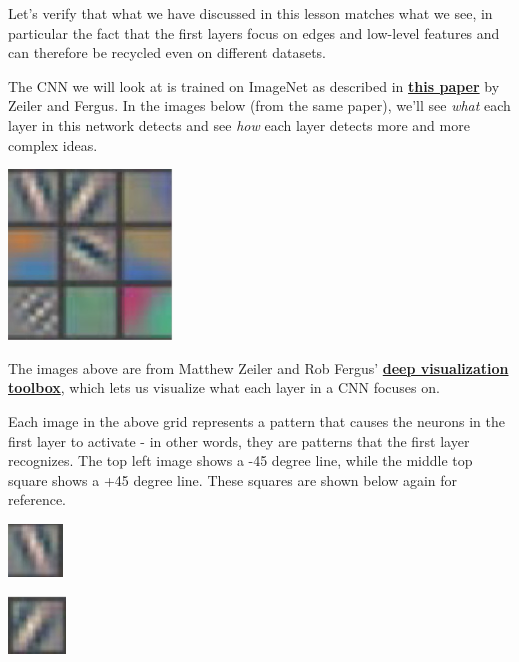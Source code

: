 Let's verify that what we have discussed in this lesson matches what we see, in particular the fact that the first layers focus on edges and low-level features and can therefore be recycled even on different datasets. \newline

The CNN we will look at is trained on ImageNet as described in \href{https://cs.nyu.edu/~fergus/papers/zeilerECCV2014.pdf}{\textbf{this paper}} by Zeiler and Fergus. In the images below (from the same paper), we’ll see \textit{what} each layer in this network detects and see \textit{how} each layer detects more and more complex ideas.

\includegraphics{img//cnn//transfer/layer-1-grid.png}

The images above are from Matthew Zeiler and Rob Fergus' \href{https://www.youtube.com/watch?v=ghEmQSxT6tw}{\textbf{deep visualization toolbox}}, which lets us visualize what each layer in a CNN focuses on.\newline

Each image in the above grid represents a pattern that causes the neurons in the first layer to activate - in other words, they are patterns that the first layer recognizes. The top left image shows a -45 degree line, while the middle top square shows a +45 degree line. These squares are shown below again for reference.

\includegraphics{img//cnn//transfer/diagonal-line-1.png}

\includegraphics{img//cnn//transfer/diagonal-line-2.png}

